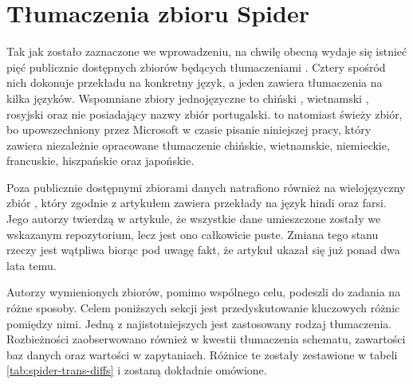 \section{Tłumaczenia zbioru Spider}
Tak jak zostało zaznaczone we wprowadzeniu, na chwilę obecną wydaje się istnieć pięć publicznie dostępnych zbiorów będących tłumaczeniami . Cztery spośród nich dokonuje przekładu na konkretny język, a jeden zawiera tłumaczenia na kilka języków. Wspomniane zbiory jednojęzyczne to chiński , wietnamski , rosyjski  oraz nie posiadający nazwy zbiór portugalski.  to natomiast świeży zbiór, bo upowszechniony przez Microsoft w czasie pisanie niniejszej pracy, który zawiera niezależnie opracowane tłumaczenie chińskie, wietnamskie, niemieckie, francuskie, hiszpańskie oraz japońskie. 

Poza publicznie dostępnymi zbiorami danych natrafiono również na wielojęzyczny zbiór  , który zgodnie z artykułem zawiera przekłady na język hindi oraz farsi. Jego autorzy twierdzą w artykule, że wszystkie dane umieszczone zostały we wskazanym repozytorium, lecz jest ono całkowicie puste. Zmiana tego stanu rzeczy jest wątpliwa biorąc pod uwagę fakt, że artykuł ukazał się już ponad dwa lata temu.

Autorzy wymienionych zbiorów, pomimo wspólnego celu, podeszli do zadania na różne sposoby. Celem poniższych sekcji jest przedyskutowanie kluczowych różnic pomiędzy nimi. Jedną z najistotniejszych jest zastosowany rodzaj tłumaczenia. Rozbieżności zaobserwowano również w kwestii tłumaczenia schematu, zawartości baz danych oraz wartości w zapytaniach. Różnice te zostały zestawione w tabeli \ref{tab:spider-trans-diffs} i zostaną dokładnie omówione.


